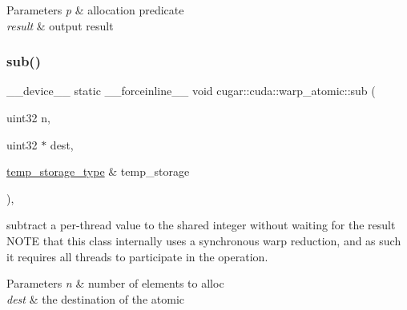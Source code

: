 \begin{DoxyParams}{Parameters}
{\em p} & allocation predicate \\
\hline
{\em result} & output result \\
\hline
\end{DoxyParams}
\mbox{\label{structcugar_1_1cuda_1_1warp__atomic_aabfa766cac8d60cfaa1aab753df361e1}} 
\subsubsection{\texorpdfstring{sub()}{sub()}\hspace{0.1cm}{\footnotesize\ttfamily [5/6]}}
{\footnotesize\ttfamily \+\_\+\+\_\+device\+\_\+\+\_\+ static \+\_\+\+\_\+forceinline\+\_\+\+\_\+ void cugar\+::cuda\+::warp\+\_\+atomic\+::sub (\begin{DoxyParamCaption}\item[{uint32}]{n,  }\item[{uint32 $\ast$}]{dest,  }\item[{\hyperlink{structcugar_1_1cuda_1_1warp__atomic_1_1temp__storage__type}{temp\+\_\+storage\+\_\+type} \&}]{temp\+\_\+storage }\end{DoxyParamCaption})\hspace{0.3cm}{\ttfamily [inline]}, {\ttfamily [static]}}

subtract a per-\/thread value to the shared integer without waiting for the result N\+O\+TE that this class internally uses a synchronous warp reduction, and as such it requires all threads to participate in the operation.


\begin{DoxyParams}{Parameters}
{\em n} & number of elements to alloc \\
\hline
{\em dest} & the destination of the atomic \\
\hline
\end{DoxyParams}
\mbox{\label{structcugar_1_1cuda_1_1warp__atomic_a99e3bd26ab9d6e49fb11b5ed312dbf82}} 
